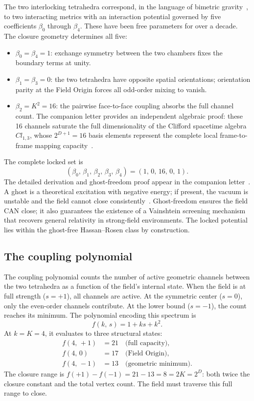 \documentclass[twocolumn]{iopjournal}
\begin{document}
The two interlocking tetrahedra correspond, in the language of bimetric gravity~\cite{HassanRosen2012a}, to two interacting metrics with an interaction potential governed by five coefficients $\beta_0$ through $\beta_4$. These have been free parameters for over a decade. The closure geometry determines all five:
\begin{itemize}
\item $\beta_0 = \beta_4 = 1$: exchange symmetry between the two chambers fixes the boundary terms at unity.
\item $\beta_1 = \beta_3 = 0$: the two tetrahedra have opposite spatial orientations; orientation parity at the Field Origin forces all odd-order mixing to vanish.
\item $\beta_2 = K^2 = 16$: the pairwise face-to-face coupling absorbs the full channel count. The companion letter provides an independent algebraic proof: these 16 channels saturate the full dimensionality of the Clifford spacetime algebra $Cl_{1,3}$, whose $2^{D+1} = 16$ basis elements represent the complete local frame-to-frame mapping capacity~\cite{Nelson2026b}.
\end{itemize}
The complete locked set is
\begin{equation}
(\beta_0,\, \beta_1,\, \beta_2,\, \beta_3,\, \beta_4) = (1,\, 0,\, 16,\, 0,\, 1).
\end{equation}
The detailed derivation and ghost-freedom proof appear in the companion letter~\cite{Nelson2026b}. A ghost is a theoretical excitation with negative energy; if present, the vacuum is unstable and the field cannot close consistently~\cite{BoulwareDeser1972}. Ghost-freedom ensures the field CAN close; it also guarantees the existence of a Vainshtein screening mechanism~\cite{Vainshtein1972} that recovers general relativity in strong-field environments. The locked potential lies within the ghost-free Hassan--Rosen class by construction.

\subsection{The coupling polynomial}

The coupling polynomial counts the number of active geometric channels between the two tetrahedra as a function of the field's internal state. When the field is at full strength ($s = +1$), all channels are active. At the symmetric center ($s = 0$), only the even-order channels contribute. At the lower bound ($s = -1$), the count reaches its minimum. The polynomial encoding this spectrum is
\begin{equation}
f(k,\, s) = 1 + ks + k^2.
\end{equation}
At $k = K = 4$, it evaluates to three structural states:
\begin{align}
f(4,\, +1) &= 21 \quad \text{(full capacity)}, \nonumber \\
f(4,\, 0) &= 17 \quad \text{(Field Origin)}, \nonumber \\
f(4,\, -1) &= 13 \quad \text{(geometric minimum)}.
\end{align}
The closure range is $f(+1) - f(-1) = 21 - 13 = 8 = 2K = 2^D$: both twice the closure constant and the total vertex count. The field must traverse this full range to close.
\end{document}
